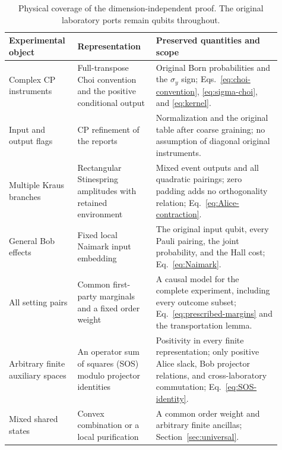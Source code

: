 \documentclass[11pt]{article}
\begin{document}
\begin{table}[ht]
\centering\small
\begin{tabular}{@{}L{0.21\linewidth}L{0.27\linewidth}L{0.43\linewidth}@{}}
\toprule
Experimental object & Representation & Preserved quantities and scope \\
\midrule
Complex CP instruments & Full-transpose Choi convention and the positive conditional output & Original Born probabilities and the $\sigma_y$ sign; Eqs.~\eqref{eq:choi-convention}, \eqref{eq:sigma-choi}, and \eqref{eq:kernel}. \\
Input and output flags & CP refinement of the reports & Normalization and the original table after coarse graining; no assumption of diagonal original instruments. \\
Multiple Kraus branches & Rectangular Stinespring amplitudes with retained environment & Mixed event outputs and all quadratic pairings; zero padding adds no orthogonality relation; Eq.~\eqref{eq:Alice-contraction}. \\
General Bob effects & Fixed local Naimark input embedding & The original input qubit, every Pauli pairing, the joint probability, and the Hall cost; Eq.~\eqref{eq:Naimark}. \\
All setting pairs & Common first-party marginals and a fixed order weight & A causal model for the complete experiment, including every outcome subset; Eq.~\eqref{eq:prescribed-margins} and the transportation lemma. \\
Arbitrary finite auxiliary spaces & An operator sum of squares (SOS) modulo projector identities & Positivity in every finite representation; only positive Alice slack, Bob projector relations, and cross-laboratory commutation; Eq.~\eqref{eq:SOS-identity}. \\
Mixed shared states & Convex combination or a local purification & A common order weight and arbitrary finite ancillas; Section~\ref{sec:universal}. \\
\bottomrule
\end{tabular}
\caption{Physical coverage of the dimension-independent proof. The original laboratory ports remain qubits throughout.}
\label{tab:proof-map}
\end{table}
\end{document}
